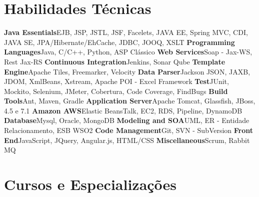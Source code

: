 \documentclass[11pt,a4paper]{moderncv}
\begin{document}


\section{Habilidades Técnicas}
\cvcomputer
{\textbf{Java Essentials}}{EJB, JSP, JSTL, JSF, Facelets, JAVA EE, Spring MVC, CDI, JAVA SE, JPA/Hibernate/EhCache, JDBC, JOOQ, XSLT}
{\textbf{Programming Languages}}{Java, C/C++, Python, ASP Clássico}
\cvcomputer
{\textbf{Web Services}}{Soap - Jax-WS, Rest Jax-RS}
{\textbf{Continuous Integration}}{Jenkins, Sonar Qube}
\cvcomputer
{\textbf{Template Engine}}{Apache Tiles, Freemarker, Velocity}
{\textbf{Data Parser}}{Jackson JSON, JAXB, JDOM, XmlBeans, Xstream, Apache POI - Excel Framework}
\cvcomputer
{\textbf{Test}}{JUnit, Mockito, Selenium, JMeter, Cobertura, Code Coverage, FindBugs}
{\textbf{Build Tools}}{Ant, Maven, Gradle}
\cvcomputer
{\textbf{Application Server}}{Apache Tomcat, Glassfish, JBoss, 4.5 e 7.1}
{\textbf{Amazon AWS}}{Elastic BeansTalk, EC2, RDS, Pipeline, DynamoDB}
\cvcomputer
{\textbf{Database}}{Mysql, Oracle, MongoDB}
{\textbf{Modeling and SOA}}{UML, ER - Entidade Relacionamento, ESB WSO2}
\cvcomputer
{\textbf{Code Management}}{Git, SVN - SubVersion}
{\textbf{Front End}}{JavaScript, JQuery, Angular.js, HTML/CSS}
\cvcomputer
{\textbf{Miscellaneous}}{Scrum, Rabbit MQ}
{}{}


\section{Cursos e Especializaç\~{o}es}

\end{document}
